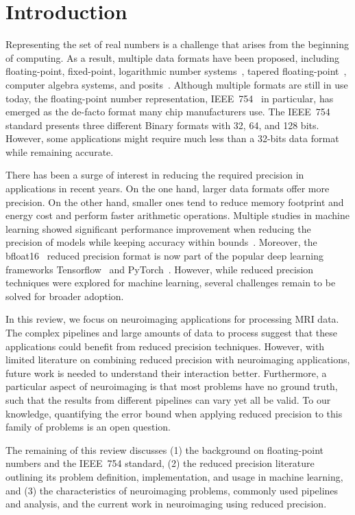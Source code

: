 \chapter{Introduction}
\label{ch:introduction}

Representing the set of real numbers is a challenge that arises from the beginning of computing.
As a result, multiple data formats have been proposed, including floating-point, fixed-point, 
logarithmic number systems~\cite{Kingsbury1971-kx}, tapered floating-point~\cite{Morris1971-qg}, 
computer algebra systems, and posits~\cite{Gustafson2017-wo}.
Although multiple formats are still in use today, the floating-point number 
representation, IEEE~754~\cite{ieee754_2008-ev} in particular, has emerged as 
the de-facto format many chip manufacturers use.
The IEEE~754 standard presents three different Binary formats with 32, 64, and 128 bits.
However, some applications might require much less than a 32-bits data format while
remaining accurate.

There has been a surge of interest in reducing the required precision in applications in recent years.
On the one hand, larger data formats offer more precision.
On the other hand, smaller ones tend to reduce memory footprint and energy cost
and perform faster arithmetic operations.
Multiple studies in machine learning showed significant performance improvement when reducing
the precision of models while keeping accuracy within bounds~\cite{Johnson2018-up,Wang2018-oo,Lesser2011-mn,Chen2018-an,Judd2015-kw,Vicuna2021-mw}.
Moreover, the bfloat16~\cite{bfloat16} reduced precision format is now part of the
popular deep learning frameworks Tensorflow~\cite{tensorflow2015-whitepaper} and PyTorch~\cite{PyTorch_2019}.
However, while reduced precision techniques were explored for machine learning,
several challenges remain to be solved for broader adoption.

In this review, we focus on neuroimaging applications for processing MRI data.
The complex pipelines and large amounts of data to process suggest that these
applications could benefit from reduced precision techniques.
However, with limited literature on combining reduced precision with neuroimaging
applications, future work is needed to understand their interaction better.
Furthermore, a particular aspect of neuroimaging is that most problems have no
ground truth,  such that the results from different pipelines can vary yet all be valid.
To our knowledge, quantifying the error bound when applying reduced precision to
this family of problems is an open question.

The remaining of this review discusses (1) the background on floating-point numbers
and the IEEE~754 standard, (2) the reduced precision literature outlining its
problem definition, implementation, and usage in machine learning, and (3) the
characteristics of neuroimaging problems, commonly used pipelines and analysis,
and the current work in neuroimaging using reduced precision.
